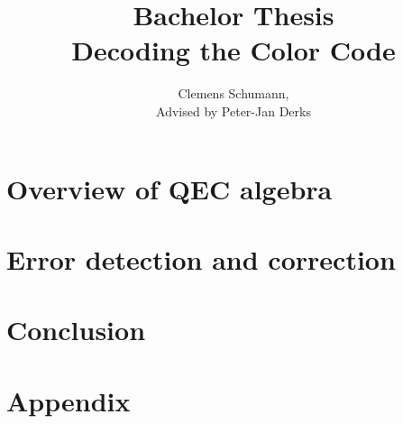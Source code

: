 \documentclass[12pt]{article}
\title{Bachelor Thesis\\ Decoding the Color Code}
\author{Clemens Schumann, \\
Advised by Peter-Jan Derks}
\begin{document}
\maketitle
\newpage
\tableofcontents
\newpage
%
\section{Overview of QEC algebra}

\newpage
\section{Error detection and correction}

\section{Conclusion}

\newpage
\section{Appendix}

\newpage
%
%
\end{document}
